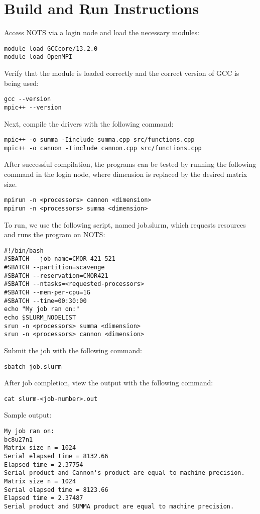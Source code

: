 \documentclass{article}
\begin{document}
\section{Build and Run Instructions}
Access NOTS via a login node and load the necessary modules:
\begin{verbatim}
module load GCCcore/13.2.0
module load OpenMPI
\end{verbatim}
Verify that the module is loaded correctly and the correct version of GCC is being used:
\begin{verbatim}
gcc --version
mpic++ --version
\end{verbatim}
Next, compile the drivers with the following command:
\begin{verbatim}
mpic++ -o summa -Iinclude summa.cpp src/functions.cpp
mpic++ -o cannon -Iinclude cannon.cpp src/functions.cpp
\end{verbatim}
After successful compilation, the programs can be tested by running the following command in the login node, where dimension is replaced by the desired matrix size.
\begin{verbatim}
mpirun -n <processors> cannon <dimension>
mpirun -n <processors> summa <dimension>
\end{verbatim}
To run, we use the following script, named job.slurm, which requests resources and runs the program on NOTS:
\begin{verbatim}
#!/bin/bash 
#SBATCH --job-name=CMOR-421-521
#SBATCH --partition=scavenge
#SBATCH --reservation=CMOR421
#SBATCH --ntasks=<requested-processors> 
#SBATCH --mem-per-cpu=1G 
#SBATCH --time=00:30:00 
echo "My job ran on:" 
echo $SLURM_NODELIST 
srun -n <processors> summa <dimension>
srun -n <processors> cannon <dimension>
\end{verbatim}
Submit the job with the following command:
\begin{verbatim}
sbatch job.slurm
\end{verbatim}
After job completion, view the output with the following command:
\begin{verbatim}
cat slurm-<job-number>.out
\end{verbatim}
Sample output:
\begin{verbatim}
My job ran on:
bc8u27n1
Matrix size n = 1024
Serial elapsed time = 8132.66
Elapsed time = 2.37754
Serial product and Cannon's product are equal to machine precision.
Matrix size n = 1024
Serial elapsed time = 8123.66
Elapsed time = 2.37487
Serial product and SUMMA product are equal to machine precision.
\end{verbatim}
\end{document}
